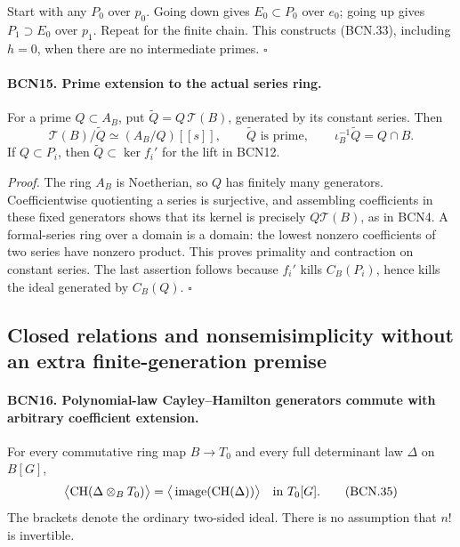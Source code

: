 Start with any \(P_0\) over \(p_0\).  Going down gives
\(E_0\subset P_0\) over \(e_0\); going up gives
\(P_1\supset E_0\) over \(p_1\).  Repeat for the finite
chain.  This constructs (BCN.33), including \(h=0\),
when there are no intermediate primes.
\hfill\(\square\)

\paragraph{BCN15. Prime extension to the actual series ring.}\label{claim:BCN15}
For a prime \(Q\subset A_B\), put
\(\widetilde Q=Q\,\mathscr T(B)\), generated by its
constant series.  Then
\[
 \mathscr T(B)/\widetilde Q\simeq(A_B/Q)[[s]],\qquad
 \widetilde Q\text{ is prime},\qquad
 \iota_B^{-1}\widetilde Q=Q\cap B .                             \tag{BCN.34}
\]
If \(Q\subset P_i\), then
\(\widetilde Q\subset\ker f_i'\) for the lift in BCN12.

\emph{Proof.}
The ring \(A_B\) is Noetherian, so \(Q\) has finitely many
generators.  Coefficientwise quotienting a series is
surjective, and assembling coefficients in these fixed
generators shows that its kernel is precisely
\(Q\mathscr T(B)\), as in BCN4.
A formal-series ring over a domain is a domain: the
lowest nonzero coefficients of two series have nonzero
product.  This proves primality and contraction on
constant series.  The last assertion follows because
\(f_i'\) kills \(C_B(P_i)\), hence kills the ideal
generated by \(C_B(Q)\).
\hfill\(\square\)

\subsection{Closed relations and nonsemisimplicity without an extra
finite-generation premise}

\paragraph{BCN16. Polynomial-law Cayley--Hamilton generators commute
with arbitrary coefficient extension.}\label{claim:BCN16}
For every commutative ring map \(B\to T_0\) and every full
determinant law \(\Delta\) on \(B[G]\),
\[
 \big\langle\mathrm{CH}(\Delta\otimes_B T_0)\big\rangle
 =
 \big\langle\operatorname{image}(\mathrm{CH}(\Delta))\big\rangle
 \quad\hbox{in }T_0[G].                                        \tag{BCN.35}
\]
The brackets denote the ordinary two-sided ideal.
There is no assumption that \(n!\) is invertible.

